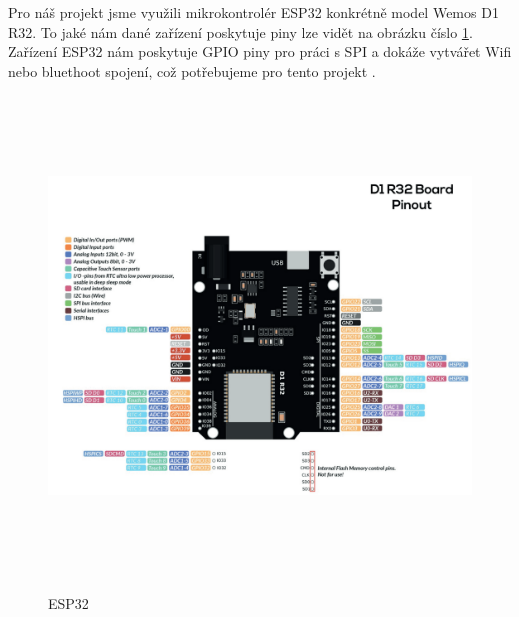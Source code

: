 Pro náš projekt jsme využili mikrokontrolér ESP32 konkrétně model Wemos D1 R32. To jaké nám dané zařízení poskytuje piny lze vidět na obrázku číslo \ref{fig:propojeniSFactory}. Zařízení ESP32 nám poskytuje GPIO piny pro práci s SPI a dokáže vytvářet Wifi nebo bluethoot spojení, což potřebujeme pro tento projekt \cite{esp}.

\begin{figure}[h]%
  \centering
  \includegraphics[width=\linewidth,height=5in]{img/esp.png}\\[1pt]
  \caption{ESP32}
  \label{fig:propojeniSFactory}
\end{figure} 
\newpage

